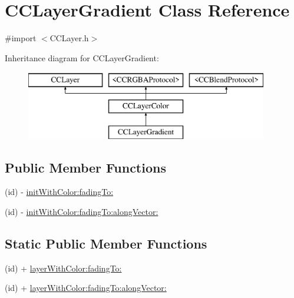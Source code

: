 \hypertarget{interface_c_c_layer_gradient}{\section{C\-C\-Layer\-Gradient Class Reference}
\label{interface_c_c_layer_gradient}
}


{\ttfamily \#import $<$C\-C\-Layer.\-h$>$}

Inheritance diagram for C\-C\-Layer\-Gradient\-:\begin{figure}[H]
\begin{center}
\leavevmode
\includegraphics[height=3.000000cm]{interface_c_c_layer_gradient}
\end{center}
\end{figure}
\subsection*{Public Member Functions}
\begin{DoxyCompactItemize}
\item 
(id) -\/ \hyperlink{interface_c_c_layer_gradient_ab2b841f823f95d100d3eece426ca8a04}{init\-With\-Color\-:fading\-To\-:}
\item 
(id) -\/ \hyperlink{interface_c_c_layer_gradient_a423099275ba10933852db7b1468f8356}{init\-With\-Color\-:fading\-To\-:along\-Vector\-:}
\end{DoxyCompactItemize}
\subsection*{Static Public Member Functions}
\begin{DoxyCompactItemize}
\item 
(id) + \hyperlink{interface_c_c_layer_gradient_a9f9f4f249a716335019dfb84fc2f1214}{layer\-With\-Color\-:fading\-To\-:}
\item 
(id) + \hyperlink{interface_c_c_layer_gradient_aa9306fc0cb991c62a88c19c0b3263551}{layer\-With\-Color\-:fading\-To\-:along\-Vector\-:}
\end{DoxyCompactItemize}
